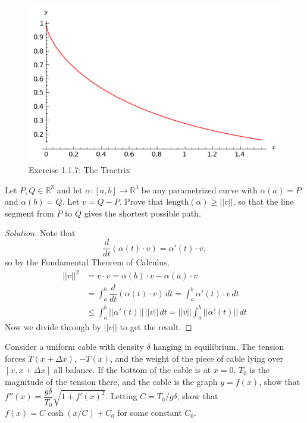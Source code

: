 \documentclass[Shifrin_Solutions_Spring_2015]{subfiles}
\begin{document}
\begin{figure}[h]
\centering
\includegraphics[width=.5\textwidth]{picturebook/ch1sec1/ex1-1-7}
\caption{Exercise 1.1.7: The Tractrix}
\end{figure}





\begin{exercise}
Let $P, Q \in \mathbb{R}^3$ and let $\alpha: [a,b] \rightarrow \mathbb{R}^3$ be any parametrized curve with $\alpha(a) = P$ and $\alpha(b) = Q$. Let $v= Q-P$. Prove that $\text{length}(\alpha) \geq ||v||$, so that the line segment from $P$ to $Q$ gives the shortest possible path.
\end{exercise}

\begin{proof}[Solution]
Note that
\[
\dfrac{d}{dt}\left( \alpha(t)\cdot v \right) = \alpha'(t)\cdot v ,
\]
so by the Fundamental Theorem of Calculus,
\[
\begin{split}
||v||^2 & = v \cdot v  =  \alpha(b)\cdot v - \alpha(a) \cdot v  \\
	& =  \int_a^b \dfrac{d}{dt}\left( \alpha(t)\cdot v \right) \, dt    = \int_a^b \alpha'(t)\cdot v \, dt \\
	& \leq \int_a^b ||\alpha'(t)|| \, ||v||\, dt = ||v|| \int_a^b ||\alpha'(t)||\, dt
\end{split}
\]
Now we divide through by $||v||$ to get the result.
\end{proof}

\vspace{.5cm}



\begin{exercise}
Consider a uniform cable with density $\delta$ hanging in equilibrium. The tension forces $T(x + \Delta x)$, $-T(x)$, and the weight of the piece of cable lying over $[x,x+\Delta x]$ all balance. If the bottom of the cable is at $x=0$, $T_0$ is the magnitude of the tension there, and the cable is the graph $y=f(x)$, show that $f''(x) = \dfrac{g\delta}{T_0}\sqrt{1 + f'(x)^2}$.  Letting $C = T_0/g\delta$, show that $f(x) = C\cosh(x/C) + C_0$ for some constant $C_0$.
\end{exercise}
\end{document}
